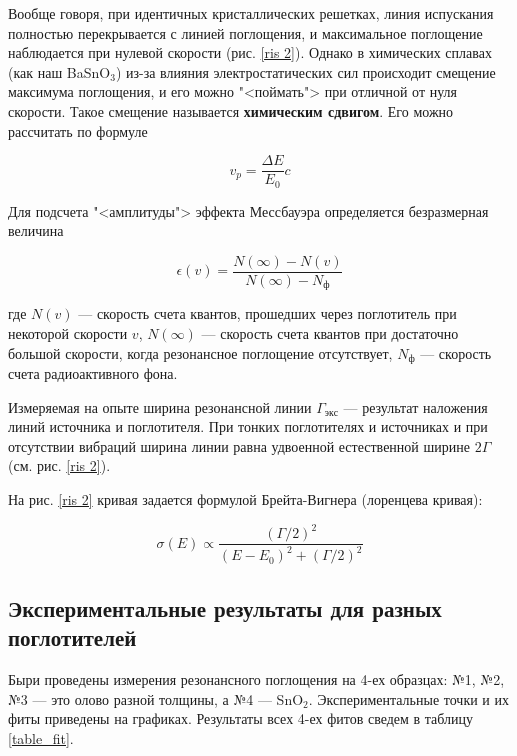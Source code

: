 \documentclass[12pt]{kiarticle}
\begin{document}
   Вообще говоря, при идентичных кристаллических решетках, линия испускания полностью перекрывается с линией поглощения, и максимальное поглощение наблюдается при нулевой скорости (рис. \ref{ris 2}). Однако в химических сплавах (как наш BaSnO$_3$) из-за влияния электростатических сил происходит смещение максимума поглощения, и его можно "<поймать"> при отличной от нуля скорости. Такое смещение называется \textbf{химическим сдвигом}. Его можно рассчитать по формуле 
   
   \begin{equation}\label{vr}
   v_p = \dfrac{\Delta E}{E_0}c
   \end{equation}
   
   Для подсчета "<амплитуды"> эффекта Мессбауэра определяется безразмерная величина
   
   \begin{equation}\label{epsi;on}
   \epsilon(v) = \dfrac{N (\infty) - N(v)}{N (\infty) - N_ф}
   \end{equation}
   
   где $ N(v) $ --- скорость счета квантов, прошедших через поглотитель при
   некоторой скорости $ v $, $ N (\infty) $ --- скорость счета квантов при достаточно
   большой скорости, когда резонансное поглощение отсутствует, $ N_ф  $ --- скорость счета радиоактивного фона.
   
   Измеряемая на опыте ширина резонансной линии $  \Gamma_{экс} $ --- результат наложения линий источника и поглотителя. При тонких поглотителях и источниках и при отсутствии вибраций ширина линии равна удвоенной естественной ширине $ 2\Gamma $ (см. рис. \ref{ris 2}).
   
   На рис. \ref{ris 2} кривая задается формулой Брейта-Вигнера (лоренцева кривая):
   
   \begin{equation}\label{B-V}
   \sigma(E) \propto \dfrac{(\Gamma/2)^2}{(E - E_0)^2 + (\Gamma/2)^2}
   \end{equation}
   
   \subsection{Экспериментальные результаты для разных поглотителей}
   
   Быри проведены измерения резонансного поглощения на 4-ех образцах: №1, №2, №3 --- это олово разной толщины, а №4 --- SnO$ _2 $. Экспериментальные точки и их фиты приведены на графиках. Результаты всех 4-ех фитов сведем в таблицу \ref{table_fit}.
   
\end{document}
